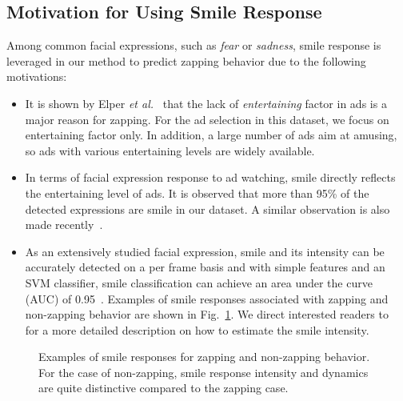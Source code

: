 \documentclass[twoside,leqno,twocolumn]{article}
\begin{document}
\subsection{Motivation for Using Smile Response}
Among common facial expressions, such as \textit{fear} or \textit{sadness}, smile response is leveraged in our method to predict zapping behavior due to the following motivations:
\begin{itemize}
\item It is shown by Elper \textit{et al.}~\cite{Elpers03} that the lack of \textit{entertaining} factor in ads is a major reason for zapping. For the ad selection in this dataset, we focus on entertaining factor only. In addition, a large number of ads aim at amusing, so ads with various entertaining levels are widely available. 

\item In terms of facial expression response to ad watching, smile directly reflects the entertaining level of ads. It is observed that more than 95\% of the detected expressions are smile in our dataset. A similar observation is also made recently~\cite{amfed}. 

\item As an extensively studied facial expression, smile and its intensity can be accurately detected on a per frame basis and with simple features and an SVM classifier, smile classification can achieve an area under the curve (AUC) of 0.95~\cite{Yang_TAC14}. Examples of smile responses associated with zapping and non-zapping behavior are shown in Fig.~\ref{fig:smile_ex}. We direct interested readers to~\cite{Yang_TAC14} for a more detailed description on how to estimate the smile intensity.


\end{itemize}

\begin{figure}[t] 
\centering
\caption{Examples of smile responses for zapping and non-zapping behavior. For the case of non-zapping, smile response intensity and dynamics are quite distinctive compared to the zapping case.}
\label{fig:smile_ex}
\end{figure}
\end{document}
